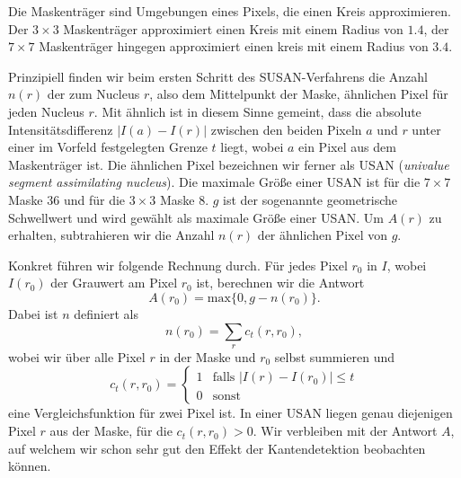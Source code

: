 \documentclass[a4paper, 11pt]{report}
\renewcommand{\emph}[1]{\textit{#1}}
\theoremstyle{definition}
\begin{document}
			Die Maskenträger sind Umgebungen eines Pixels, die einen Kreis approximieren. Der $3 \times 3$ Maskenträger approximiert einen Kreis mit einem Radius von $1.4$, der $7 \times 7$ Maskenträger hingegen approximiert einen kreis mit einem Radius von $3.4$.

			Prinzipiell finden wir beim ersten Schritt des SUSAN-Verfahrens die Anzahl $n(r)$ der zum Nucleus $r$, also dem Mittelpunkt der Maske, ähnlichen Pixel für jeden Nucleus $r$. Mit \glqq ähnlich\grqq{} ist in diesem Sinne gemeint, dass die absolute Intensitätsdifferenz $|I(a)-I(r)|$ zwischen den beiden Pixeln $a$ und $r$ unter einer im Vorfeld festgelegten Grenze $t$ liegt, wobei $a$ ein Pixel aus dem Maskenträger ist. Die ähnlichen Pixel bezeichnen wir ferner als USAN (\emph{univalue segment assimilating nucleus}). Die maximale Größe einer USAN ist für die $7 \times 7$ Maske $36$ und für die $3 \times 3$ Maske $8$. $g$ ist der sogenannte geometrische Schwellwert und wird gewählt als maximale Größe einer USAN. Um $A(r)$ zu erhalten, subtrahieren wir die Anzahl $n(r)$ der ähnlichen Pixel von $g$.

			Konkret führen wir folgende Rechnung durch.
			Für jedes Pixel $r_0$ in $I$, wobei $I(r_0)$ der Grauwert am Pixel $r_0$ ist, berechnen wir die Antwort
				$$A(r_0) = \text{max}\{0, g - n(r_0)\}.$$
			Dabei ist $n$ definiert als
				$$n(r_0) = \sum_r c_t(r, r_0),$$
			wobei wir über alle Pixel $r$ in der Maske und $r_0$ selbst summieren und	
				$$
					c_t(r, r_0) =
						\begin{cases}
							1 	& \text{falls } |I(r) - I(r_0)| \leq t 	\\
							0 	& \text{sonst}
						\end{cases}
				$$
			eine Vergleichsfunktion für zwei Pixel ist. In einer USAN liegen genau diejenigen Pixel $r$ aus der Maske, für die $c_t(r, r_0) > 0$. Wir verbleiben mit der Antwort $A$, auf welchem wir schon sehr gut den Effekt der Kantendetektion beobachten können.
\end{document}

